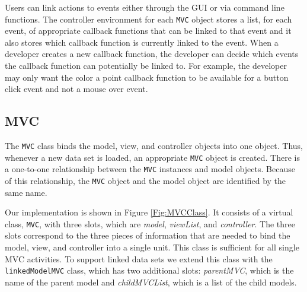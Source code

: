 \documentclass{article}[11pt]
\newcommand{\Robject}[1]{{\texttt{#1}}}
\newcommand{\Rslot}[1]{\textsl{#1}}
\newcommand{\Rclass}[1]{\texttt{#1}}
\begin{document}
Users can link actions to events either through the GUI or via
command line functions.  The controller environment for each \Robject{MVC}
object stores a list, for each event, of appropriate callback functions that
can be linked to that event and it also stores which callback function is
currently linked to the event.  When a developer creates a new callback
function, the developer can decide which events the callback function can
potentially be linked to.  For example, the developer may only want the color
a point callback function to be available for a button click event and not a
mouse over event.


\subsection{MVC}
\label{Ssec:OneMVC}
 
The \Rclass{MVC} class binds the model, view, and controller objects
into one object.  Thus, whenever a new data set is loaded, an
appropriate \Robject{MVC} object is created.  There is a one-to-one
relationship between the \Robject{MVC} instances and model objects.
Because of this relationship, the \Robject{MVC} object and the model
object are identified by the same name.

Our implementation is shown in Figure \ref{Fig:MVCClass}. It consists
of a virtual class, \Rclass{MVC}, with three slots, which are
\Rslot{model}, \Rslot{viewList}, and \Rslot{controller}. The three
slots correspond to the three pieces of information that are needed to
bind the model, view, and controller into a single unit. This class is
sufficient for all single MVC activities. To support linked data sets
we extend this class with the \Rclass{linkedModelMVC} class, which has
two additional slots: \Rslot{parentMVC}, which is the name of the
parent model and \Rslot{childMVCList}, which is a
list of the child models.  
\end{document}
